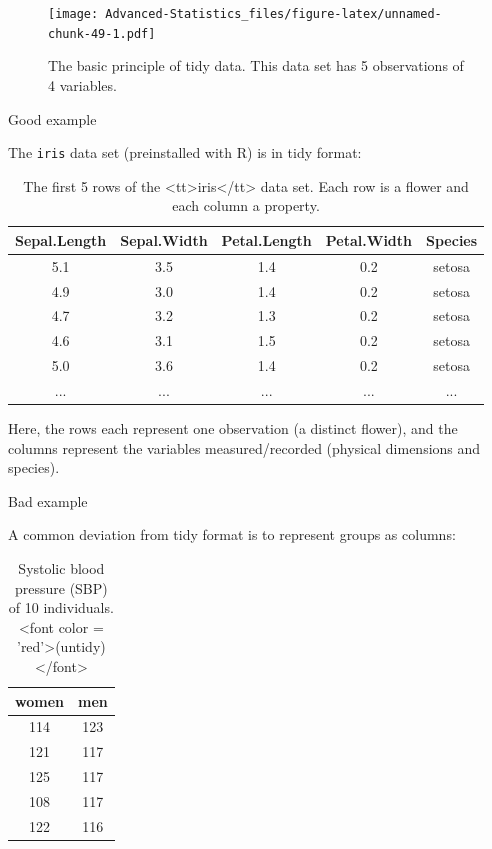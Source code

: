 \documentclass[
]{book}
\begin{document}
\begin{figure}
\centering
\texttt{[image: Advanced-Statistics\_files/figure-latex/unnamed-chunk-49-1.pdf]}
\caption{\label{fig:unnamed-chunk-49}The basic principle of tidy data. This data set has 5 observations of 4 variables.}
\end{figure}

Good example

The \texttt{iris} data set (preinstalled with R) is in tidy format:

\begin{table}

\caption{\label{tab:unnamed-chunk-50}The first 5 rows of the <tt>iris</tt> data set. Each row is a flower and each column a property.}
\centering
\fontsize{11}{13}\selectfont
\begin{tabular}[t]{c|c|c|c|c}
\hline
Sepal.Length & Sepal.Width & Petal.Length & Petal.Width & Species\\
\hline
5.1 & 3.5 & 1.4 & 0.2 & setosa\\
\hline
4.9 & 3.0 & 1.4 & 0.2 & setosa\\
\hline
4.7 & 3.2 & 1.3 & 0.2 & setosa\\
\hline
4.6 & 3.1 & 1.5 & 0.2 & setosa\\
\hline
5.0 & 3.6 & 1.4 & 0.2 & setosa\\
\hline
... & ... & ... & ... & ...\\
\hline
\end{tabular}
\end{table}

Here, the rows each represent one observation (a distinct flower), and the columns represent the variables measured/recorded (physical dimensions and species).

Bad example

A common deviation from tidy format is to represent groups as columns:

\begin{table}

\caption{\label{tab:unnamed-chunk-51}Systolic blood pressure (SBP) of 10 individuals. <font color = 'red'>(untidy)</font>}
\centering
\fontsize{11}{13}\selectfont
\begin{tabular}[t]{c|c}
\hline
women & men\\
\hline
114 & 123\\
\hline
121 & 117\\
\hline
125 & 117\\
\hline
108 & 117\\
\hline
122 & 116\\
\hline
\end{tabular}
\end{table}
\end{document}
